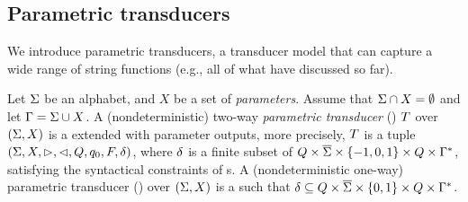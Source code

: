 

\subsection{Parametric transducers}

We introduce parametric transducers, a transducer model that can 
capture a wide range of string functions (e.g., all of what have discussed so far). 


\begin{definition}
    Let $\Sigma$ be an alphabet, and $X$ be a set of \emph{parameters}. 
    Assume that $\Sigma \cap X = \emptyset$  and let $\Gamma = \Sigma \cup X$. 
    A (nondeterministic) two-way \emph{parametric transducer} (\PPT)  $T$ over 
    $(\Sigma,X)$ is a  \FFT{}  extended with  parameter outputs, more precisely, $T$ is a tuple 
    $(\Sigma, X, \vartriangleright, \vartriangleleft, Q, q_0, F, \delta)$, where
 $\delta$ is a finite subset of $Q \times 
    \overline{\Sigma}\times \{-1, 0, 1\}\times 
    Q \times \Gamma^*$, satisfying the syntactical constraints of \FFT{}s.   
    A (nondeterministic one-way) parametric transducer (\PT) over
    $(\Sigma,X)$ is a \PPT{} such that
 $\delta\subseteq Q \times 
    \overline{\Sigma}\times \{0, 1\}\times 
    Q \times \Gamma^*$.   
\end{definition}

